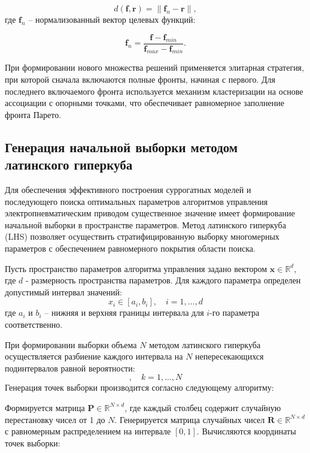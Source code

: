 \begin{equation}
d(\mathbf{f}, \mathbf{r}) = \|\mathbf{f}_n - \mathbf{r}\|,
\end{equation}
где $\mathbf{f}_n$ -- нормализованный вектор целевых функций:

\begin{equation}
\mathbf{f}_n = \frac{\mathbf{f} - \mathbf{f}_{min}}{\mathbf{f}_{max} - \mathbf{f}_{min}}.
\end{equation}

При формировании нового множества решений применяется элитарная стратегия, при которой сначала включаются полные
фронты, начиная с первого. Для последнего включаемого фронта используется механизм
кластеризации на основе ассоциации с опорными точками, что обеспечивает равномерное заполнение фронта Парето.

\subsection{Генерация начальной выборки методом латинского гиперкуба}\label{sec:ch4/sec4/subsec1}
Для обеспечения эффективного построения суррогатных моделей и последующего поиска
оптимальных параметров алгоритмов управления электропневматическим приводом существенное
значение имеет формирование начальной выборки в пространстве параметров.
Метод латинского гиперкуба (LHS) позволяет осуществить стратифицированную выборку
многомерных параметров с обеспечением равномерного покрытия области поиска.

Пусть пространство параметров алгоритма управления задано
вектором $\mathbf{x} \in \mathbb{R}^d$, где $d$ - размерность пространства параметров.
Для каждого параметра определен допустимый интервал значений:
\begin{equation}
x_i \in [a_i, b_i], \quad i = 1,\ldots,d
\end{equation}
где $a_i$ и $b_i$ -- нижняя и верхняя границы интервала для $i$-го параметра соответственно.

При формировании выборки объема $N$ методом латинского гиперкуба
осуществляется разбиение каждого интервала
на $N$ непересекающихся подинтервалов равной вероятности:
\begin{equation}
[a_i + \frac{k-1}{N}(b_i - a_i), a_i + \frac{k}{N}(b_i - a_i)], \quad k = 1,\ldots,N
\end{equation}
Генерация точек выборки производится согласно следующему алгоритму:

Формируется матрица $\mathbf{P} \in \mathbb{R}^{N \times d}$, где каждый столбец содержит случайную перестановку чисел от 1 до $N$.
Генерируется матрица случайных чисел $\mathbf{R} \in \mathbb{R}^{N \times d}$ с равномерным распределением на интервале $[0,1]$.
Вычисляются координаты точек выборки:

